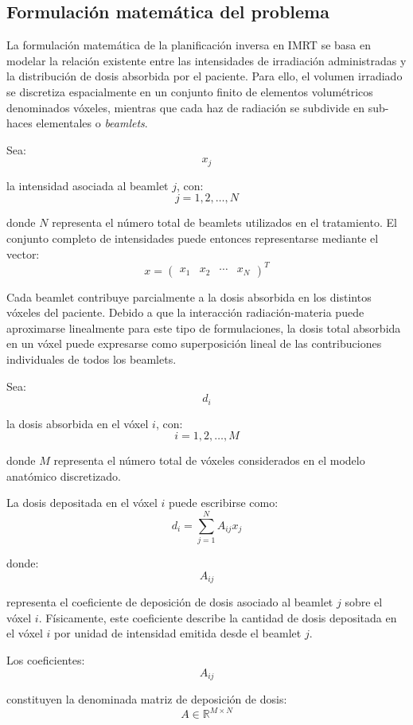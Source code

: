 \subsection{Formulación matemática del problema}

La formulación matemática de la planificación inversa en IMRT se basa en modelar la relación existente entre las intensidades de irradiación administradas y la distribución de dosis absorbida por el paciente. Para ello, el volumen irradiado se discretiza espacialmente en un conjunto finito de elementos volumétricos denominados vóxeles, mientras que cada haz de radiación se subdivide en sub-haces elementales o \textit{beamlets}.

Sea:
\[
x_j
\]

la intensidad asociada al beamlet \(j\), con:
\[
j=1,2,\dots,N
\]

donde \(N\) representa el número total de beamlets utilizados en el tratamiento. El conjunto completo de intensidades puede entonces representarse mediante el vector:
\[
x=
\begin{pmatrix}
x_1 & x_2 & \cdots & x_N
\end{pmatrix}^T
\]

Cada beamlet contribuye parcialmente a la dosis absorbida en los distintos vóxeles del paciente. Debido a que la interacción radiación-materia puede aproximarse linealmente para este tipo de formulaciones, la dosis total absorbida en un vóxel puede expresarse como superposición lineal de las contribuciones individuales de todos los beamlets.

Sea:
\[
d_i
\]

la dosis absorbida en el vóxel \(i\), con:
\[
i=1,2,\dots,M
\]

donde \(M\) representa el número total de vóxeles considerados en el modelo anatómico discretizado.

La dosis depositada en el vóxel \(i\) puede escribirse como:
\[
d_i=
\sum_{j=1}^{N}
A_{ij}x_j
\]

donde:
\[
A_{ij}
\]

representa el coeficiente de deposición de dosis asociado al beamlet \(j\) sobre el vóxel \(i\). Físicamente, este coeficiente describe la cantidad de dosis depositada en el vóxel \(i\) por unidad de intensidad emitida desde el beamlet \(j\).

Los coeficientes:
\[
A_{ij}
\]

constituyen la denominada matriz de deposición de dosis:
\[
A\in\mathbb{R}^{M\times N}
\]

